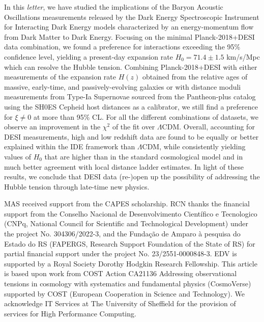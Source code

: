\documentclass[superscriptaddress,twocolumn,showpacs,a4paper,
amssymb,amsmath,nobibnotes,aps,prl,
showkeys,
nofootinbib,notitlepage]{revtex4-1}
\begin{document}
\bigskip
In this \textit{letter}, we have studied the implications of the Baryon Acoustic Oscillations measurements released by the Dark Energy Spectroscopic Instrument for Interacting Dark Energy models characterized by an energy-momentum flow from Dark Matter to Dark Energy. Focusing on the minimal Planck-2018+DESI data combination, we found a preference for interactions exceeding the 95\% confidence level, yielding a present-day expansion rate $H_0=71.4\pm1.5$ km/s/Mpc which can resolve the Hubble tension. Combining Planck-2018+DESI with either measurements of the expansion rate $H(z)$ obtained from the relative ages of massive, early-time, and passively-evolving galaxies or with distance moduli measurements from Type-Ia Supernovae sourced from the Pantheon-plus catalog using the SH0ES Cepheid host distances as a calibrator, we still find a preference for $\xi \neq 0$ at more than 95\% CL. For all the different combinations of datasets, we observe an improvement in the $\chi^2$ of the fit over $\Lambda$CDM. Overall, accounting for DESI measurements, high and low redshift data are found to be equally or better explained within the IDE framework than $\Lambda$CDM, while consistently yielding values of $H_0$ that are higher than in the standard cosmological model and in much better agreement with local distance ladder estimates. In light of these results, we conclude that DESI data (re-)open up the possibility of addressing the Hubble tension through late-time new physics.
\begin{acknowledgments}
\bigskip
\noindent MAS received support from the CAPES scholarship. RCN thanks the financial support from the Conselho Nacional de Desenvolvimento Cient\'{i}fico e Tecnologico (CNPq, National Council for Scientific and Technological Development) under the project No. 304306/2022-3, and the Fundação de Amparo à pesquisa do Estado do RS (FAPERGS, Research Support Foundation of the State of RS) for partial financial support under the project No. 23/2551-0000848-3. EDV is supported by a Royal Society Dorothy Hodgkin Research Fellowship. This article is based upon work from COST Action CA21136 Addressing observational tensions in cosmology with systematics and fundamental physics (CosmoVerse) supported by COST (European Cooperation in Science and Technology). We acknowledge IT Services at The University of Sheffield for the provision of services for High Performance Computing.
\end{acknowledgments}
%

\end{document}
